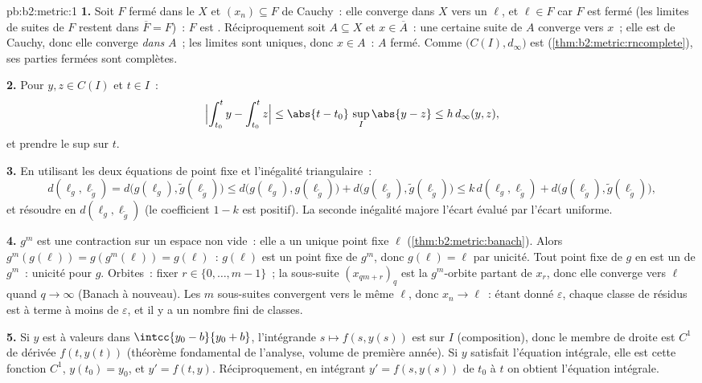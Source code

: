 \begin{solution}{pb:b2:metric:1}
\textbf{1.} Soit $F$ fermé dans le  $X$ et $(x_n) \subseteq F$
de Cauchy~: elle converge dans $X$ vers un $\ell$, et $\ell \in F$
car $F$ est fermé (les limites de suites de $F$ restent dans
$\overline F = F$)~: $F$ est . Réciproquement soit $A
\subseteq X$  et $x \in \overline A$~: une certaine suite de
$A$ converge vers $x$~; elle est de Cauchy, donc elle converge
\emph{dans} $A$~; les limites sont uniques, donc $x \in A$~: $A$
fermé. Comme $\bigl(C(I), d_\infty\bigr)$ est 
(\cref{thm:b2:metric:rncomplete}), ses parties fermées sont
complètes.

\textbf{2.} Pour $y, z \in C(I)$ et $t \in I$~:
\[
\Bigl|\int_{t_0}^{t}y - \int_{t_0}^{t}z\Bigr| \leq
\abs{t - t_0}\,\sup_I\abs{y - z} \leq h\,d_\infty(y, z),
\]
et prendre le sup sur $t$.

\textbf{3.} En utilisant les deux équations de point fixe et
l'inégalité triangulaire~:
\[
d(\ell_g, \ell_{\widetilde g})
= d\bigl(g(\ell_g), \widetilde g(\ell_{\widetilde g})\bigr)
\leq d\bigl(g(\ell_g), g(\ell_{\widetilde g})\bigr) +
d\bigl(g(\ell_{\widetilde g}), \widetilde g(\ell_{\widetilde
g})\bigr)
\leq k\,d(\ell_g, \ell_{\widetilde g}) +
d\bigl(g(\ell_{\widetilde g}), \widetilde g(\ell_{\widetilde
g})\bigr),
\]
et résoudre en $d(\ell_g, \ell_{\widetilde g})$ (le coefficient $1 -
k$ est positif). La seconde inégalité majore l'écart évalué par
l'écart uniforme.

\textbf{4.} $g^m$ est une contraction sur un espace  non
vide~: elle a un unique point fixe $\ell$
(\cref{thm:b2:metric:banach}). Alors $g^m(g(\ell)) = g(g^m(\ell)) =
g(\ell)$~: $g(\ell)$ est un point fixe de $g^m$, donc $g(\ell) =
\ell$ par unicité. Tout point fixe de $g$ en est un de $g^m$~:
unicité pour $g$. Orbites~: fixer $r \in \{0, \dots, m-1\}$~; la
sous-suite $(x_{qm + r})_q$ est la $g^m$-orbite partant de $x_r$,
donc elle converge vers $\ell$ quand $q \to \infty$ (Banach à
nouveau). Les $m$ sous-suites convergent vers le même $\ell$, donc
$x_n \to \ell$~: étant donné $\varepsilon$, chaque classe de résidus
est à terme à moins de $\varepsilon$, et il y a un nombre fini de
classes.

\textbf{5.} Si $y$ est  à valeurs dans $\intcc{y_0 - b}{y_0 +
b}$, l'intégrande $s \mapsto f(s, y(s))$ est  sur $I$
(composition), donc le membre de droite est $C^1$ de dérivée $f(t,
y(t))$ (théorème fondamental de l'analyse, volume de première année).
Si $y$ satisfait l'équation intégrale, elle est cette fonction $C^1$,
$y(t_0) = y_0$, et $y' = f(t, y)$. Réciproquement, en intégrant $y' =
f(s, y(s))$ de $t_0$ à $t$ on obtient l'équation intégrale.


\end{solution}
